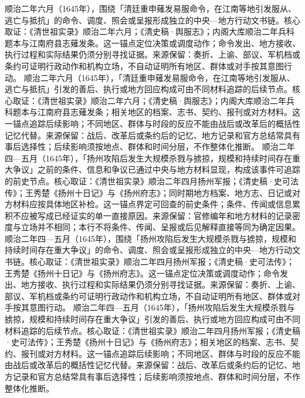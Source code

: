 顺治二年六月（1645年），围绕「清廷重申薙发易服命令，在江南等地引发服从、逃亡与抵抗」的命令、调度、照会或呈报形成独立的中央—地方行动文书链。核心取证：《清世祖实录》顺治二年六月；《清史稿·舆服志》；内阁大库顺治二年兵科题本与江南府县志薙发条。这一锚点定位决策或调度动作；命令发出、地方接收、执行过程和实际结果仍须分别寻找证据。来源保留：奏折、上谕、部议、军机档或条约可证明行政动作和机构立场，不自动证明所有地区、群体或对手按其意图行动。
顺治二年六月（1645年），「清廷重申薙发易服命令，在江南等地引发服从、逃亡与抵抗」引发的善后、执行或地方回应构成可由不同材料追踪的后续节点。核心取证：《清世祖实录》顺治二年六月；《清史稿·舆服志》；内阁大库顺治二年兵科题本与江南府县志薙发条；相关地区的档案、志书、契约、报刊或对方材料。这一锚点追踪后续影响；不同地区、群体与时段的反应不能由战后或改革后的概括性记忆代替。来源保留：战后、改革后或条约后的记忆、地方记录和官方总结常具有事后选择性；后续影响须按地点、群体和时间分层，不作整体化推断。
顺治二年四—五月（1645年），「扬州攻陷后发生大规模杀戮与掳掠，规模和持续时间存在重大争议」之前的条件、信息和争议已通过中央与地方材料显现，构成该事件可追踪的前史节点。核心取证：《清世祖实录》顺治二年四月扬州军报；《清史稿·史可法传》；王秀楚《扬州十日记》与《扬州府志》；同时期地方档案、地方志、日记或对方材料应按具体地区补检。这一锚点界定可回查的前史条件；条件、传闻或信息累积不应被写成已经证实的单一直接原因。来源保留：官修编年和地方材料的记录密度与立场并不相同；本行不将条件、传闻、呈报或后见解释直接等同为确定因果。
顺治二年四—五月（1645年），围绕「扬州攻陷后发生大规模杀戮与掳掠，规模和持续时间存在重大争议」的命令、调度、照会或呈报形成独立的中央—地方行动文书链。核心取证：《清世祖实录》顺治二年四月扬州军报；《清史稿·史可法传》；王秀楚《扬州十日记》与《扬州府志》。这一锚点定位决策或调度动作；命令发出、地方接收、执行过程和实际结果仍须分别寻找证据。来源保留：奏折、上谕、部议、军机档或条约可证明行政动作和机构立场，不自动证明所有地区、群体或对手按其意图行动。
顺治二年四—五月（1645年），「扬州攻陷后发生大规模杀戮与掳掠，规模和持续时间存在重大争议」引发的善后、执行或地方回应构成可由不同材料追踪的后续节点。核心取证：《清世祖实录》顺治二年四月扬州军报；《清史稿·史可法传》；王秀楚《扬州十日记》与《扬州府志》；相关地区的档案、志书、契约、报刊或对方材料。这一锚点追踪后续影响；不同地区、群体与时段的反应不能由战后或改革后的概括性记忆代替。来源保留：战后、改革后或条约后的记忆、地方记录和官方总结常具有事后选择性；后续影响须按地点、群体和时间分层，不作整体化推断。
